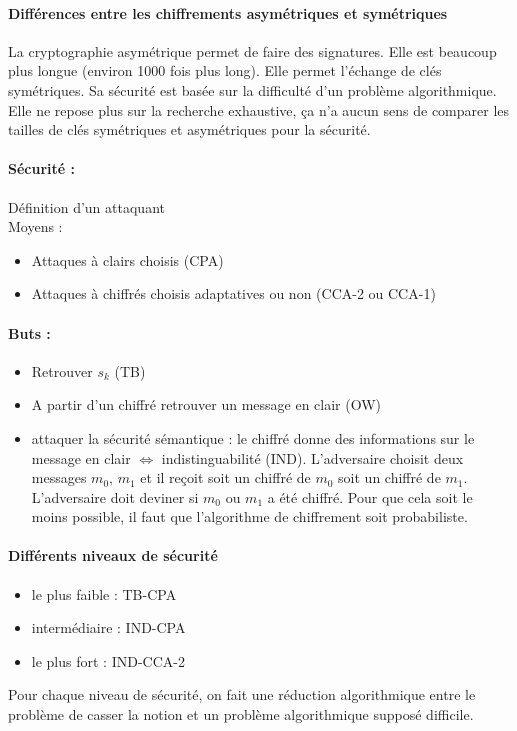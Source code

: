 \documentclass[12pt,a4paper]{report}
\begin{document}
\paragraph{Différences entre les chiffrements asymétriques et symétriques\\}
La cryptographie asymétrique permet de faire des signatures. Elle est beaucoup plus longue (environ 1000 fois plus long). Elle permet l'échange de clés symétriques. Sa sécurité est basée sur la difficulté d'un problème algorithmique. Elle ne repose plus sur la recherche exhaustive, ça n'a aucun sens de comparer les tailles de clés symétriques et asymétriques pour la sécurité.
\paragraph{Sécurité :} Définition d'un attaquant \\
Moyens : 
\begin{itemize}
\item Attaques à clairs choisis (CPA)
\item Attaques à chiffrés choisis adaptatives ou non (CCA-2 ou CCA-1)
\end{itemize}
\paragraph{Buts :\\}
\begin{itemize}
\item Retrouver $s_k$ (TB)
\item A partir d'un chiffré retrouver un message en clair (OW)
\item attaquer la sécurité sémantique : le chiffré donne des informations sur le message en clair $\Longleftrightarrow$ indistinguabilité (IND). L'adversaire choisit deux messages $m_0$, $m_1$ et il reçoit soit un chiffré de $m_0$ soit un chiffré de $m_1$. L'adversaire doit deviner si $m_0$ ou $m_1$ a été chiffré. Pour que cela soit le moins possible, il faut que l'algorithme de chiffrement soit probabiliste.
\end{itemize}
\paragraph{Différents niveaux de sécurité\\}
\begin{itemize}
\item le plus faible : TB-CPA
\item intermédiaire : IND-CPA
\item le plus fort : IND-CCA-2
\end{itemize}
Pour chaque niveau de sécurité, on fait une réduction algorithmique entre le problème de casser la notion et un problème algorithmique supposé difficile.
\end{document}
